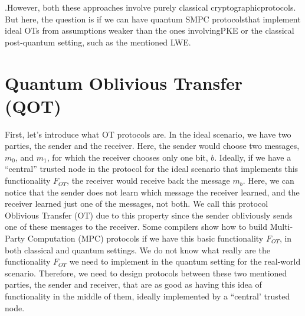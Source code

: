 \documentclass[12pt]{article}
\begin{document}
\cite{fehr-schaffner:composing-quantum-protocols-classical-environment:2008:03-2024,damgard-fehr-lunemann-salvail-schaffner:improving-security-quantum-protocols-commit-and-open:2009:03-2024,bouman-fehr:sampling-quantum-population-and-applications:2012:03-2024,uhruh:universally-composable-quantum-multi-party-computation:2010:03-2024}.\break However, both these approaches involve purely classical cryptographic\break protocols. But here, the question is if we can have quantum SMPC protocols\break that implement ideal OTs from assumptions weaker than the ones involving\break PKE or the classical post-quantum setting, such as the mentioned LWE.

    
    \section{Quantum Oblivious Transfer (QOT)}
    \label{sec:quantum-oblivious-transfer}

    First, let's introduce what OT protocols are. In the ideal scenario, we have two parties, the sender and the receiver. Here, the sender would choose two messages, ${m}_{0}$, and ${m}_{1}$, for which the receiver chooses only one bit, $b$. Ideally, if we have a ``central'' trusted node in the protocol for the ideal scenario that implements this functionality ${F}_{OT}$, the receiver would receive back the message ${m}_{b}$. Here, we can notice that the sender does not learn which message the receiver learned, and the receiver learned just one of the messages, not both. We call this protocol Oblivious Transfer (OT) due to this property since the sender obliviously sends one of these messages to the receiver. Some compilers show how to build Multi-Party Computation (MPC) protocols if we have this basic functionality ${F}_{OT}$, in both classical and quantum settings. We do not know what really are the functionality ${F}_{OT}$ we need to implement in the quantum setting for the real-world scenario. Therefore, we need to design protocols between these two mentioned parties, the sender and receiver, that are as good as having this idea of functionality in the middle of them, ideally implemented by a ``central' trusted node.
    
\end{document}
